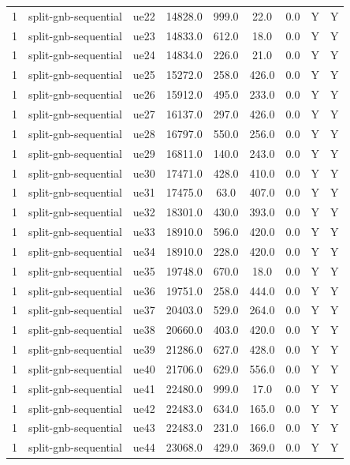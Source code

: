 \begin{table}[ht]
\begin{tabular}{|c|c|c|c|c|c|c|c|c|}
1 & split-gnb-sequential & ue22 & 14828.0 & 999.0 & 22.0 & 0.0 & Y & Y \\
1 & split-gnb-sequential & ue23 & 14833.0 & 612.0 & 18.0 & 0.0 & Y & Y \\
1 & split-gnb-sequential & ue24 & 14834.0 & 226.0 & 21.0 & 0.0 & Y & Y \\
1 & split-gnb-sequential & ue25 & 15272.0 & 258.0 & 426.0 & 0.0 & Y & Y \\
1 & split-gnb-sequential & ue26 & 15912.0 & 495.0 & 233.0 & 0.0 & Y & Y \\
1 & split-gnb-sequential & ue27 & 16137.0 & 297.0 & 426.0 & 0.0 & Y & Y \\
1 & split-gnb-sequential & ue28 & 16797.0 & 550.0 & 256.0 & 0.0 & Y & Y \\
1 & split-gnb-sequential & ue29 & 16811.0 & 140.0 & 243.0 & 0.0 & Y & Y \\
1 & split-gnb-sequential & ue30 & 17471.0 & 428.0 & 410.0 & 0.0 & Y & Y \\
1 & split-gnb-sequential & ue31 & 17475.0 & 63.0 & 407.0 & 0.0 & Y & Y \\
1 & split-gnb-sequential & ue32 & 18301.0 & 430.0 & 393.0 & 0.0 & Y & Y \\
1 & split-gnb-sequential & ue33 & 18910.0 & 596.0 & 420.0 & 0.0 & Y & Y \\
1 & split-gnb-sequential & ue34 & 18910.0 & 228.0 & 420.0 & 0.0 & Y & Y \\
1 & split-gnb-sequential & ue35 & 19748.0 & 670.0 & 18.0 & 0.0 & Y & Y \\
1 & split-gnb-sequential & ue36 & 19751.0 & 258.0 & 444.0 & 0.0 & Y & Y \\
1 & split-gnb-sequential & ue37 & 20403.0 & 529.0 & 264.0 & 0.0 & Y & Y \\
1 & split-gnb-sequential & ue38 & 20660.0 & 403.0 & 420.0 & 0.0 & Y & Y \\
1 & split-gnb-sequential & ue39 & 21286.0 & 627.0 & 428.0 & 0.0 & Y & Y \\
1 & split-gnb-sequential & ue40 & 21706.0 & 629.0 & 556.0 & 0.0 & Y & Y \\
1 & split-gnb-sequential & ue41 & 22480.0 & 999.0 & 17.0 & 0.0 & Y & Y \\
1 & split-gnb-sequential & ue42 & 22483.0 & 634.0 & 165.0 & 0.0 & Y & Y \\
1 & split-gnb-sequential & ue43 & 22483.0 & 231.0 & 166.0 & 0.0 & Y & Y \\
1 & split-gnb-sequential & ue44 & 23068.0 & 429.0 & 369.0 & 0.0 & Y & Y \\

\end{tabular}
\end{table}
